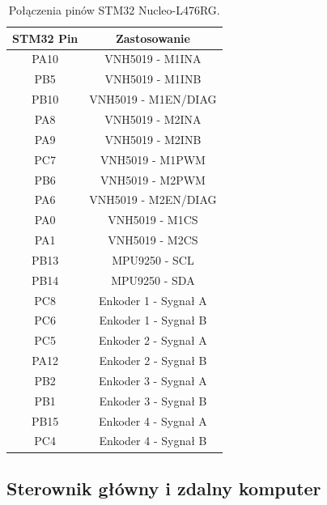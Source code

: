 \begin{table}[ht]
	\centering
	\caption{Połączenia pinów STM32 Nucleo-L476RG. }
	\label{stm_pins}
	\begin{tabular}{|c|c|}
		\hline
		\textbf{STM32 Pin} & \textbf{Zastosowanie} \\ \hline
		PA10               & VNH5019  - M1INA      \\ \hline
		PB5                & VNH5019 - M1INB       \\ \hline
		PB10               & VNH5019 - M1EN/DIAG   \\ \hline
		PA8                & VNH5019 - M2INA       \\ \hline
		PA9                & VNH5019 - M2INB       \\ \hline
		PC7                & VNH5019 - M1PWM       \\ \hline
		PB6                & VNH5019 - M2PWM       \\ \hline
		PA6                & VNH5019 - M2EN/DIAG   \\ \hline
		PA0                & VNH5019 - M1CS        \\ \hline
		PA1                & VNH5019 - M2CS        \\ \hline
		PB13               & MPU9250 - SCL         \\ \hline
		PB14               & MPU9250 - SDA         \\ \hline
		PC8                & Enkoder 1 - Sygnał A  \\ \hline
		PC6                & Enkoder 1 - Sygnał B  \\ \hline
		PC5                & Enkoder 2 - Sygnał A  \\ \hline
		PA12               & Enkoder 2 - Sygnał B  \\ \hline
		PB2                & Enkoder 3 - Sygnał A  \\ \hline
		PB1                & Enkoder 3 - Sygnał B  \\ \hline
		PB15               & Enkoder 4 - Sygnał A  \\ \hline
		PC4                & Enkoder 4 - Sygnał B  \\ \hline
	\end{tabular}
\end{table}

\subsection{Sterownik główny i zdalny komputer}

